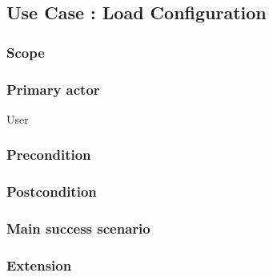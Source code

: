 \subsection{Use Case : Load Configuration}

\subsubsection{Scope}

\subsubsection{Primary actor}
User
\subsubsection{Precondition}

\subsubsection{Postcondition}

\subsubsection{Main success scenario}

\subsubsection{Extension}
